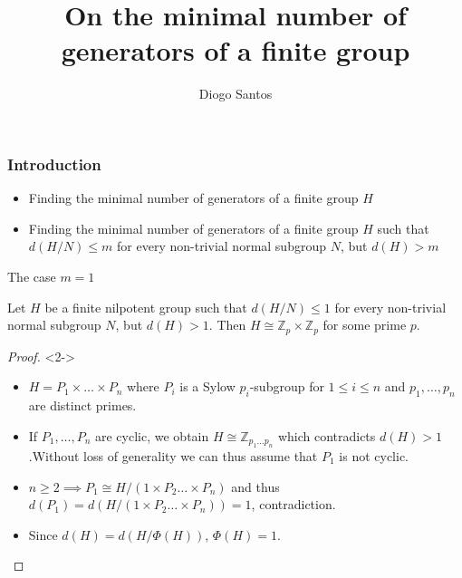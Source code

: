 \documentclass{beamer}
\title{On the minimal number of generators of a finite group}
\author{Diogo Santos}
\begin{document}
\maketitle

\begin{frame}
    \frametitle{Introduction}
    \begin{itemize}
        \item<1-> Finding the minimal number of generators of a finite group $H$ \\
    \end{itemize}
    \begin{itemize}
        \item<2-> Finding the minimal number of generators of a finite group $H$ such that $d(H/N) \le m$ for every non-trivial normal subgroup $N$, but $d(H) > m$\\
    \end{itemize}

\end{frame}

\begin{frame}{The case $m = 1$}
    \begin{theorem}
        Let $H$ be a finite nilpotent group such that $d(H/N) \le 1$ for every non-trivial normal subgroup $N$, but $d(H) > 1$. Then $H \cong \mathbb{Z}_p \times \mathbb{Z}_p$ for some prime $p$.
    \end{theorem}

    \begin{proof}<2->
        \renewcommand{\qedsymbol}{} %
        \begin{itemize}
            \item $H = P_1 \times \ldots  \times P_n$ where $P_i$ is a Sylow $p_i$-subgroup for $1 \le i \le n$ and $p_1,\ldots ,p_n$ are distinct primes.
            \item<3-> If $P_1,\ldots , P_n$ are cyclic, we obtain $H \cong \mathbb{Z}_{p_1\ldots p_n}$  which contradicts $d(H) > 1$.Without loss of generality we can thus assume that $P_1$ is not cyclic.
            \item<4-> $n \ge 2 \implies P_1 \cong H/(1 \times P_2 \ldots  \times P_n)$ and thus $d(P_1) = d(H/(1 \times P_2 \ldots  \times P_n)) = 1$, contradiction.
            \item<5-> Since $d(H) = d(H/\Phi(H))$, $\Phi(H) = 1$.
        \end{itemize}
    \end{proof}
\end{frame}
\end{document}
